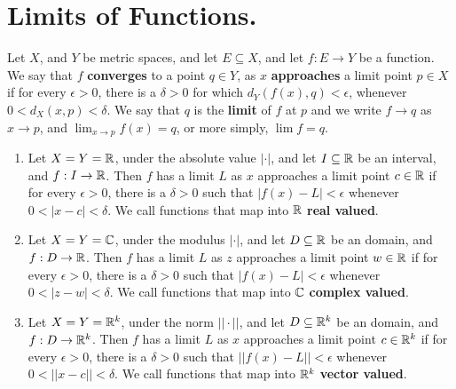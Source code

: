 
\section{Limits of Functions.}

\begin{definition}
    Let $X$, and  $Y$ be metric spaces, and let  $E \subseteq X$, and let  $f:E \rightarrow Y$ be a 
    function. We say that $f$ \textbf{converges} to a point $q \in Y$, as $x$ \textbf{approaches} a 
    limit point $p \in X$ if for every  $\epsilon>0$, there is a  $\delta>0$ for which 
    $d_Y(f(x),q)<\epsilon$, whenever $0<d_X(x,p)<\delta$. We say that  $q$ is the  \textbf{limit} of $f$ 
    at  $p$ and we write  $f \rightarrow q$ as  $x \rightarrow p$, and  $\lim_{x \rightarrow p}{f(x)}=q$, or more 
    simply, $\lim{f}=q$.
\end{definition}

\begin{example}
    \begin{enumerate}[label=(\arabic*)]
        \item Let $X=Y=\mathbb{R}$, under the absolute value  $|\cdot|$, and let  $I \subseteq \mathbb{R}$ be 
            an interval, and $f:I \rightarrow \mathbb{R}$. Then  $f$ has a limit  $L$ as  $x$ approaches 
            a limit point  $c \in \mathbb{R}$ if for every  $\epsilon>0$, there is a  $\delta>0$ such that 
            $|f(x)-L|<\epsilon$ whenever  $0<|x-c|<\delta$. We call functions that map into $\mathbb{R}$ 
            \textbf{real valued}.

        \item Let $X=Y=\mathbb{C}$, under the modulus  $|\cdot|$, and let  $D \subseteq \mathbb{R}$ be 
            an domain, and $f:D \rightarrow \mathbb{R}$. Then  $f$ has a limit  $L$ as  $z$ approaches 
            a limit point  $w \in \mathbb{R}$ if for every  $\epsilon>0$, there is a  $\delta>0$ such that 
            $|f(x)-L|<\epsilon$ whenever  $0<|z-w|<\delta$. We call functions that map into $\mathbb{C}$ 
            \textbf{complex valued}.

        \item Let $X=Y=\mathbb{R}^k$, under the norm  $||\cdot||$, and let  $D \subseteq \mathbb{R}^k$ be 
            an domain, and $f:D \rightarrow \mathbb{R}^k$. Then  $f$ has a limit  $L$ as  $x$ approaches 
            a limit point  $c \in \mathbb{R}^k$ if for every  $\epsilon>0$, there is a  $\delta>0$ such that 
            $||f(x)-L||<\epsilon$ whenever  $0<||x-c||<\delta$. We call functions that map into $\mathbb{R}^k$ 
            \textbf{vector valued}.
    \end{enumerate}		
\end{example} 


